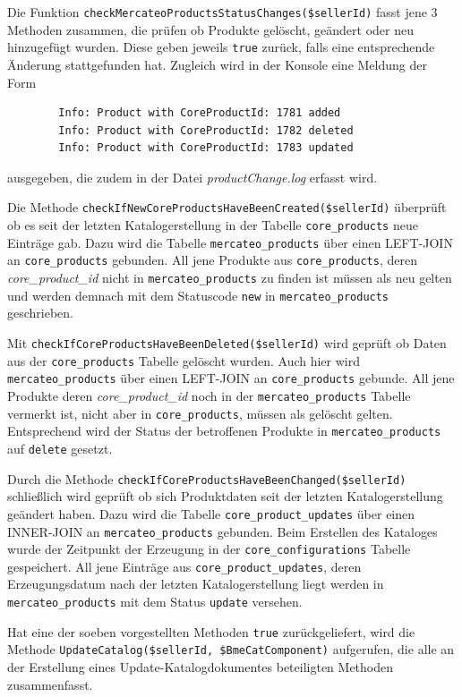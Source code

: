 	Die Funktion \texttt{checkMercateoProductsStatusChanges(\$sellerId)} fasst
 	jene 3 Methoden zusammen, die prüfen ob Produkte gelöscht, geändert oder neu hinzugefügt wurden. Diese geben jeweils \texttt{true} zurück, falls eine entsprechende Änderung stattgefunden hat. Zugleich wird in der Konsole eine Meldung der Form 	
		\begin{lstlisting}
		Info: Product with CoreProductId: 1781 added
		Info: Product with CoreProductId: 1782 deleted
		Info: Product with CoreProductId: 1783 updated
		\end{lstlisting} ausgegeben, die zudem in der Datei \textit{productChange.log} erfasst wird.
			
		Die Methode \texttt{checkIfNewCoreProductsHaveBeenCreated(\$sellerId)} überprüft ob es seit der letzten Katalogerstellung in der Tabelle \texttt{core\_products} neue Einträge gab. Dazu wird die Tabelle \texttt{mercateo\_products} über einen LEFT-JOIN an \texttt{core\_products} gebunden. All jene Produkte aus \texttt{core\_products}, deren \textit{core\_product\_id} nicht in \texttt{mercateo\_products} zu finden ist müssen als neu gelten und werden demnach mit dem Statuscode \texttt{new} in \texttt{mercateo\_products} geschrieben. 
		
	
		Mit \texttt{checkIfCoreProductsHaveBeenDeleted(\$sellerId)} wird geprüft ob Daten aus der \texttt{core\_products} Tabelle gelöscht wurden. Auch hier wird \texttt{mercateo\_products} über einen LEFT-JOIN an \texttt{core\_products} gebunde. All jene Produkte deren \textit{core\_product\_id} 
		noch in der \texttt{mercateo\_products} Tabelle vermerkt ist, nicht aber in \texttt{core\_products}, müssen als gelöscht gelten. Entsprechend wird der Status der betroffenen Produkte in \texttt{mercateo\_products} auf \texttt{delete} gesetzt.
		
		Durch die Methode \texttt{checkIfCoreProductsHaveBeenChanged(\$sellerId)} schließlich wird geprüft ob sich Produktdaten seit der letzten Katalogerstellung geändert haben. Dazu wird die Tabelle \texttt{core\_product\_updates} über einen INNER-JOIN an \texttt{mercateo\_products} gebunden.
		Beim Erstellen des Kataloges wurde der Zeitpunkt der Erzeugung in der \texttt{core\_configurations} Tabelle gespeichert. All jene Einträge aus \texttt{core\_product\_updates}, deren Erzeugungsdatum nach der letzten Katalogerstellung liegt werden in \texttt{mercateo\_products} mit dem Status \texttt{update} versehen.
	
	Hat eine der soeben vorgestellten Methoden \texttt{true} zurückgeliefert, wird die Methode \texttt{UpdateCatalog(\$sellerId, \$BmeCatComponent)} aufgerufen, die alle an der Erstellung eines Update-Katalogdokumentes beteiligten Methoden zusammenfasst.
	
